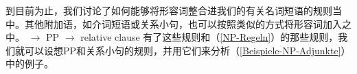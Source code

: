 \noindent
到目前为止，我们讨论了如何能够将形容词整合进我们的有关名词短语的规则当中。其他附加语，如介词短语或关系小句，也可以按照类似的方式将形容词加入\nbarc 之中。
\eal
\ex\label{xbar-PP-Adjunkt-an-N} \nbar $\to$ \nbar PP
\ex \nbar $\to$ \nbar relative clause
\zl
有了这些规则和（\ref{NP-Regeln}）的那些规则，我们就可以设想PP和关系小句的规则，并用它们来分析（\ref{Beispiele-NP-Adjunkte}）中的例子。

